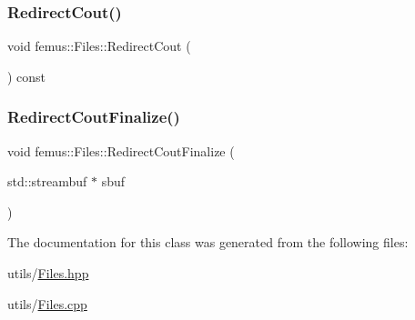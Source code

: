 \mbox{\label{classfemus_1_1_files_ac1aac5a52d5f5479931d238fd72702a6}} 
\subsubsection{\texorpdfstring{Redirect\+Cout()}{RedirectCout()}}
{\footnotesize\ttfamily void femus\+::\+Files\+::\+Redirect\+Cout (\begin{DoxyParamCaption}{ }\end{DoxyParamCaption}) const}

\mbox{\label{classfemus_1_1_files_ae26af478b9b9c891c929c6c26fcb3295}} 
\subsubsection{\texorpdfstring{Redirect\+Cout\+Finalize()}{RedirectCoutFinalize()}}
{\footnotesize\ttfamily void femus\+::\+Files\+::\+Redirect\+Cout\+Finalize (\begin{DoxyParamCaption}\item[{std\+::streambuf $\ast$}]{sbuf }\end{DoxyParamCaption})\hspace{0.3cm}{\ttfamily [static]}}



The documentation for this class was generated from the following files\+:\begin{DoxyCompactItemize}
\item 
utils/\mbox{\hyperlink{_files_8hpp}{Files.\+hpp}}\item 
utils/\mbox{\hyperlink{_files_8cpp}{Files.\+cpp}}\end{DoxyCompactItemize}
